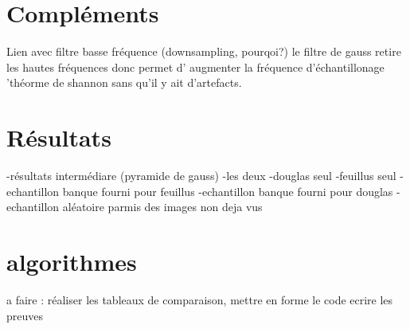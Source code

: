 \documentclass{article}
\begin{document}
\nocite{NatesanResNet} %



\begin{appendix}

	\section{Compléments}
		Lien avec filtre basse fréquence (downsampling, pourqoi?)
		le filtre de gauss retire les hautes fréquences donc permet d' augmenter la fréquence d'échantillonage 'théorme de shannon sans qu'il y ait d'artefacts. 
	
	\section{Résultats}	
		-résultats intermédiare (pyramide de gauss)
		-les deux 
		-douglas seul 
		-feuillus seul
		-echantillon banque fourni pour feuillus
		-echantillon banque fourni pour douglas 
		-echantillon aléatoire parmis des images non deja vus
	
	\section{algorithmes}
\end{appendix}


a faire : réaliser les tableaux de comparaison, mettre en forme le code 
ecrire les preuves 
\end{document}
